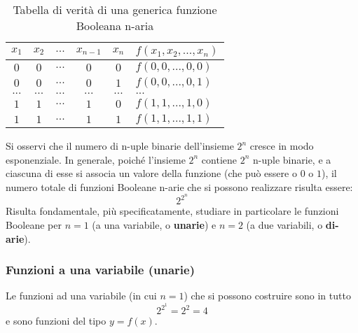 \documentclass[a4paper]{extarticle}
\begin{document}
\begin{table}[H]
    \centering
    \begin{tabularx}{\textwidth}{ccccc|P}
         \(x_1\) & \(x_2\) & \(...\) & \(x_{n - 1}\) & \(x_n\) & \(f(x_1, x_2, ..., x_n)\)\\
         \hline
         \(0\) & \(0\) & \(...\) & \(0\) & \(0\) & \(f(0, 0, ..., 0, 0)\)\\
         \(0\) & \(0\) & \(...\) & \(0\) & \(1\) & \(f(0, 0, ..., 0, 1)\)\\
         \(...\) & \(...\) & \(...\) & \(...\) & \(...\) & \(...\)\\
         \(1\) & \(1\) & \(...\) & \(1\) & \(0\) & \(f(1, 1, ..., 1, 0)\)\\
         \(1\) & \(1\) & \(...\) & \(1\) & \(1\) & \(f(1, 1, ..., 1, 1)\)\\
    \end{tabularx}
    \caption{Tabella di verità di una generica funzione Booleana n-aria}
    \label{tab:tabella_verita_funzione_naria}
\end{table}

\noindent
Si osservi che il numero di n-uple binarie dell’insieme \(2^n\) cresce in modo esponenziale. In generale, poiché l’insieme \(2^n\) contiene \(2^n\) n-uple binarie, e a ciascuna di esse si associa un valore della funzione (che può essere o \(0\) o \(1\)), il numero totale di funzioni Booleane n-arie che si possono realizzare risulta essere:
\[2^{2^{n}}\]
Risulta fondamentale, più specificatamente, studiare in particolare le funzioni Booleane per \(n = 1\) (a una variabile, o \textbf{unarie}) e \(n = 2\) (a due variabili, o \textbf{di-arie}).

\subsubsection{Funzioni a una variabile (unarie)}
Le funzioni ad una variabile (in cui \(n = 1\)) che si possono costruire sono in tutto
\[2^{2^1} = 2^2 = 4\]
e sono funzioni del tipo \(y = f(x)\).
\end{document}
